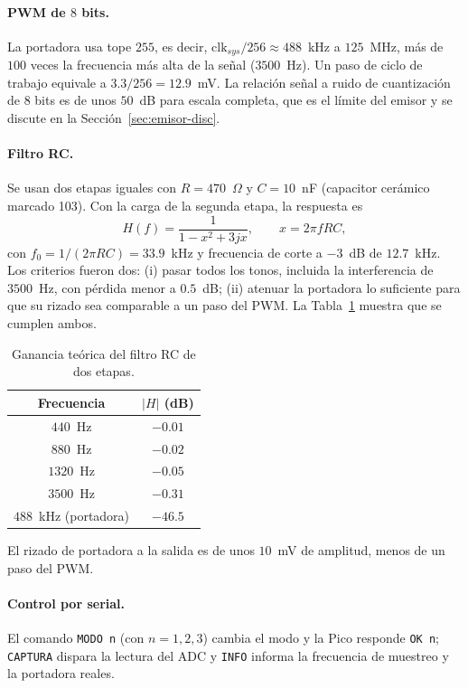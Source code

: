 \paragraph{PWM de $8$ bits.} La portadora usa tope $255$, es decir, $\mathrm{clk}_{sys}/256 \approx 488$~kHz a $125$~MHz, más de $100$ veces la frecuencia más alta de la señal ($3500$~Hz). Un paso de ciclo de trabajo equivale a $3.3/256 = 12.9$~mV. La relación señal a ruido de cuantización de $8$ bits es de unos $50$~dB para escala completa, que es el límite del emisor y se discute en la Sección~\ref{sec:emisor-disc}.

\paragraph{Filtro RC.} Se usan dos etapas iguales con $R = 470$~$\Omega$ y $C = 10$~nF (capacitor cerámico marcado 103). Con la carga de la segunda etapa, la respuesta es
\begin{equation}
H(f) = \frac{1}{1 - x^2 + 3jx}, \qquad x = 2\pi f R C,
\end{equation}
con $f_0 = 1/(2\pi RC) = 33.9$~kHz y frecuencia de corte a $-3$~dB de $12.7$~kHz. Los criterios fueron dos: (i) pasar todos los tonos, incluida la interferencia de $3500$~Hz, con pérdida menor a $0.5$~dB; (ii) atenuar la portadora lo suficiente para que su rizado sea comparable a un paso del PWM. La Tabla~\ref{tab:rc} muestra que se cumplen ambos.

\begin{table}[h]
\centering
\begin{tabular}{|c|c|}
\hline
\textbf{Frecuencia} & \textbf{$|H|$ (dB)} \\ \hline
$440$~Hz & $-0.01$ \\ \hline
$880$~Hz & $-0.02$ \\ \hline
$1320$~Hz & $-0.05$ \\ \hline
$3500$~Hz & $-0.31$ \\ \hline
$488$~kHz (portadora) & $-46.5$ \\ \hline
\end{tabular}
\caption{Ganancia teórica del filtro RC de dos etapas.}
\label{tab:rc}
\end{table}

El rizado de portadora a la salida es de unos $10$~mV de amplitud, menos de un paso del PWM.

\paragraph{Control por serial.} El comando \texttt{MODO n} (con $n=1,2,3$) cambia el modo y la Pico responde \texttt{OK n}; \texttt{CAPTURA} dispara la lectura del ADC y \texttt{INFO} informa la frecuencia de muestreo y la portadora reales.

